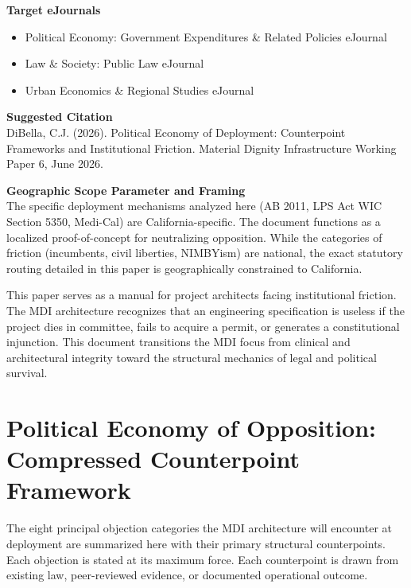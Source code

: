 \documentclass[12pt, letterpaper]{article}
\begin{document}
\vspace{8pt}
\noindent\textbf{Target eJournals}
\begin{itemize}[nosep, before={\vspace{-8pt}}, leftmargin=2em]
    \item Political Economy: Government Expenditures \& Related Policies eJournal
    \item Law \& Society: Public Law eJournal
    \item Urban Economics \& Regional Studies eJournal
\end{itemize}

\vspace{8pt}
\noindent\textbf{Suggested Citation}\\[1pt]
DiBella, C.J. (2026). Political Economy of Deployment: Counterpoint Frameworks and Institutional Friction. Material Dignity Infrastructure Working Paper 6, June 2026.

\newpage

\vspace{8pt}
\noindent\textbf{Geographic Scope Parameter and Framing}\\[1pt]
The specific deployment mechanisms analyzed here (AB 2011, LPS Act WIC Section 5350, Medi-Cal) are California-specific. The document functions as a localized proof-of-concept for neutralizing opposition. While the categories of friction (incumbents, civil liberties, NIMBYism) are national, the exact statutory routing detailed in this paper is geographically constrained to California.

This paper serves as a manual for project architects facing institutional friction. The MDI architecture recognizes that an engineering specification is useless if the project dies in committee, fails to acquire a permit, or generates a constitutional injunction. This document transitions the MDI focus from clinical and architectural integrity toward the structural mechanics of legal and political survival.

\newpage
\begingroup
{}
\setlength{\cftbeforesecskip}{2pt}
\setlength{\cftbeforesubsecskip}{-2pt}
\tableofcontents
\endgroup

\clearpage
{}

\section{Political Economy of Opposition: Compressed Counterpoint Framework}

The eight principal objection categories the MDI architecture will encounter at deployment are summarized here with their primary structural counterpoints. Each objection is stated at its maximum force. Each counterpoint is drawn from existing law, peer-reviewed evidence, or documented operational outcome.
\end{document}
